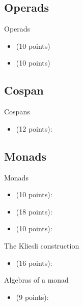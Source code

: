 \subsection{Operads}

Operads
\begin{itemize}
    \item {} (10 points)  
    \item {} (10 points) 
\end{itemize}

\subsection{Cospan}

Cospans
\begin{itemize}
    \item {} (12 points): 
\end{itemize}

\subsection{Monads}

Monads
\begin{itemize}
    \item {} (10 points): 
    \item {} (18 points): 
    \item {} (10 points): 
\end{itemize}
The Kliesli construction
\begin{itemize}
    \item {} (16 points): 
\end{itemize}
Algebras of a monad
\begin{itemize}
    \item {} (9 points): 
\end{itemize}
